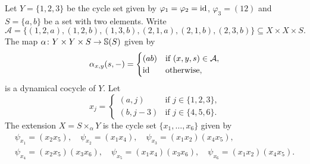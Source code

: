 \begin{example}
	\label{exa:GI}
        Let $Y=\{1,2,3\}$ be the cycle set given by $\varphi_1=\varphi_2=\operatorname{id}$,
        $\varphi_3=(12)$ and $S=\{a,b\}$ be a set with two elements. Write
        \[
                \mathcal{A}=\{(1,2,a),(1,2,b),(1,3,b),(2,1,a),(2,1,b),(2,3,b)\}\subseteq X\times X\times S.
        \]
        The map
        $\alpha\colon Y\times Y\times S\to\mathbb{S}(S)$ given by
        \[
        \alpha_{x,y}(s,-)=\begin{cases}
                (ab) & \text{if $(x,y,s)\in\mathcal{A}$},\\
                \operatorname{id} & \text{otherwise},
        \end{cases}
        \]
        is a dynamical cocycle of $Y$. Let 
        \[
                x_j=\begin{cases}
                        (a,j) & \text{if $j\in\{1,2,3\}$,}\\
                        (b,j-3) & \text{if $j\in\{4,5,6\}$.}
                \end{cases}
        \]
        The extension $X=S\times_\alpha Y$ is the cycle set $\{x_1,\dots,x_6\}$ given by
        \begin{gather*}
			\psi_{x_1}=(x_2x_5),\quad
			\psi_{x_2}=(x_1x_4),\quad
			\psi_{x_3}=(x_1x_2)(x_4x_5),\\
			\psi_{x_4}=(x_2x_5)(x_3x_6),\quad
			\psi_{x_5}=(x_1x_4)(x_3x_6),\quad
			\psi_{x_6}=(x_1x_2)(x_4x_5).
        \end{gather*}
\end{example}

